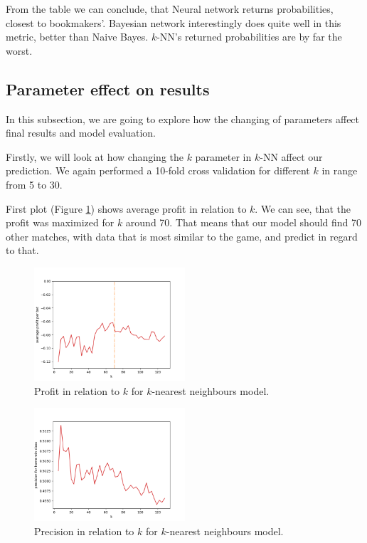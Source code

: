 \documentclass[conference]{IEEEtran}
\begin{document}
From the table we can conclude, that Neural network returns probabilities, closest
to bookmakers'. Bayesian network interestingly does quite well in this metric,
better than Naive Bayes. $k$-NN's returned probabilities are by far the worst.

\subsection{Parameter effect on results}

In this subsection, we are going to explore how the changing of parameters affect final 
results and model evaluation. 

Firstly, we will look at how changing the $k$ parameter in $k$-NN affect our prediction.
We again performed a 10-fold cross validation for different $k$ in range from 5 to 30.

First plot (Figure \ref{profit-knn}) shows average profit in relation to $k$. We can see, 
that the profit was maximized for $k$ around 70. That means that our model should find 70 
other matches, with data that is most similar to the game, and predict in regard to that.

\begin{figure}[!ht]
\includegraphics[width=0.5\textwidth]{profit_k_knn.png}
\caption{Profit in relation to $k$ for $k$-nearest neighbours model.}
\label{profit-knn}
\end{figure}

\begin{figure}[!ht]
\includegraphics[width=0.5\textwidth]{precision_k_knn.png}
\caption{Precision in relation to $k$ for $k$-nearest neighbours model.}
\label{prec-knn}
\end{figure}
\end{document}
